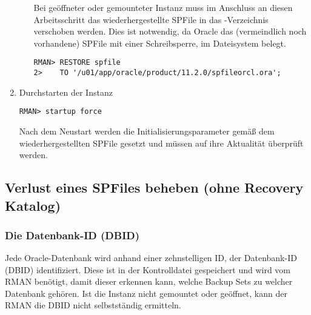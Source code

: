 \begin{enumerate}
\begin{itemize}
                Bei geöffneter oder gemounteter Instanz muss im Anschluss an diesen Arbeitsschritt das wiederhergestellte SPFile in das -Verzeichnis verschoben werden. Dies ist notwendig, da Oracle das (vermeindlich noch vorhandene) SPFile mit einer Schreibsperre, im Dateisystem belegt.
								\begin{lstlisting}[caption={Wiederherstellen des SPFiles in der MOUNT-Phase},label=admin1413,language=rman]
RMAN> RESTORE spfile
2>    TO '/u01/app/oracle/product/11.2.0/spfileorcl.ora';
                  \end{lstlisting}
              \end{itemize}
            \item Durchstarten der Instanz
              \begin{lstlisting}[caption={Neustart der Instanz},label=admin1414,language=rman,alsolanguage=sqlplus]
RMAN> startup force
              \end{lstlisting}
              Nach dem Neustart werden die Initialisierungsparameter gemäß dem wiederhergestellten SPFile gesetzt und müssen auf ihre Aktualität überprüft werden.
          \end{enumerate}
\clearpage
      \subsection{Verlust eines SPFiles beheben (ohne Recovery Katalog)}
        \subsubsection{Die Datenbank-ID (DBID)}
          Jede Oracle-Datenbank wird anhand einer zehnstelligen ID, der Datenbank-ID (DBID) identifiziert. Diese ist in der Kontrolldatei gespeichert und wird vom RMAN benötigt, damit dieser erkennen kann, welche Backup Sets zu welcher Datenbank gehören. Ist die Instanz nicht gemountet oder geöffnet, kann der RMAN die DBID nicht selbstständig ermitteln.

